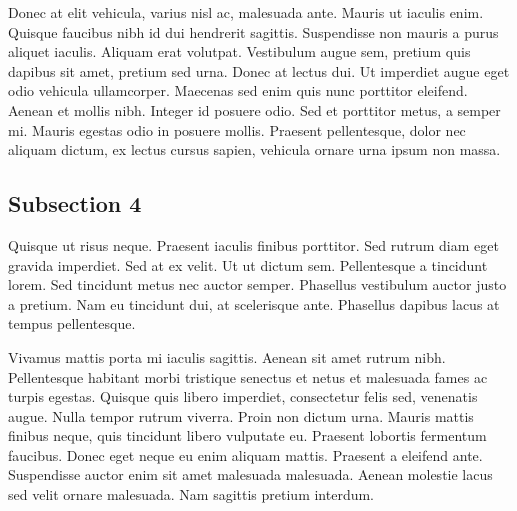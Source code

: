 Donec at elit vehicula, varius nisl ac, malesuada ante. Mauris ut iaculis enim. Quisque faucibus nibh id dui hendrerit sagittis. Suspendisse non mauris a purus aliquet iaculis. Aliquam erat volutpat. Vestibulum augue sem, pretium quis dapibus sit amet, pretium sed urna. Donec at lectus dui. Ut imperdiet augue eget odio vehicula ullamcorper. Maecenas sed enim quis nunc porttitor eleifend. Aenean et mollis nibh. Integer id posuere odio. Sed et porttitor metus, a semper mi. Mauris egestas odio in posuere mollis. Praesent pellentesque, dolor nec aliquam dictum, ex lectus cursus sapien, vehicula ornare urna ipsum non massa.

\subsection{Subsection 4}

Quisque ut risus neque. Praesent iaculis finibus porttitor. Sed rutrum diam eget gravida imperdiet. Sed at ex velit. Ut ut dictum sem. Pellentesque a tincidunt lorem. Sed tincidunt metus nec auctor semper. Phasellus vestibulum auctor justo a pretium. Nam eu tincidunt dui, at scelerisque ante. Phasellus dapibus lacus at tempus pellentesque.

Vivamus mattis porta mi iaculis sagittis. Aenean sit amet rutrum nibh. Pellentesque habitant morbi tristique senectus et netus et malesuada fames ac turpis egestas. Quisque quis libero imperdiet, consectetur felis sed, venenatis augue. Nulla tempor rutrum viverra. Proin non dictum urna. Mauris mattis finibus neque, quis tincidunt libero vulputate eu. Praesent lobortis fermentum faucibus. Donec eget neque eu enim aliquam mattis. Praesent a eleifend ante. Suspendisse auctor enim sit amet malesuada malesuada. Aenean molestie lacus sed velit ornare malesuada. Nam sagittis pretium interdum. 